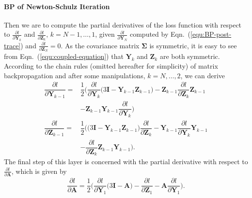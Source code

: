 \documentclass[10pt,twocolumn,letterpaper]{article}
\begin{document}
\paragraph{BP of Newton-Schulz Iteration} Then we are to compute the partial derivatives of the loss function with respect to $\frac{\partial l}{\partial \mathbf{Y}_{k}}$ and $\frac{\partial l}{\partial \mathbf{Z}_{k}}$, $k=N-1, \ldots, 1$, given $\frac{\partial l}{\partial \mathbf{Y}_{N}}$ computed by Eqn.~(\ref{equ:BP-post-trace}) and  $\frac{\partial l}{\partial \mathbf{Z}_{N}}=0$. As the covariance matrix $\boldsymbol{\Sigma}$ is symmetric, it is easy to see from Eqn.~(\ref{equ:coupled-equation}) that $\mathbf{Y}_{k}$ and $\mathbf{Z}_{k}$ are both symmetric. According to the chain rules (omitted hereafter  for simplicity) of matrix backpropagation and after some manipulations, $k=N, \ldots, 2$, we can derive
\begin{align}\label{equ:BP-coupled-equations}
\dfrac{\partial l}{\partial \mathbf{Y}_{k-1}}=&\dfrac{1}{2}\Big(\dfrac{\partial l}{\partial \mathbf{Y}_{k}}\Big(3\mathbf{I}-\mathbf{Y}_{k-1}\mathbf{Z}_{k-1}\Big)-\mathbf{Z}_{k-1}\dfrac{\partial l}{\partial \mathbf{Z}_{k}}\mathbf{Z}_{k-1}\nonumber \\
&-\mathbf{Z}_{k-1}\mathbf{Y}_{k-1}\dfrac{\partial l}{\partial \mathbf{Y}_{k}}\Big)\nonumber\\
\dfrac{\partial l}{\partial \mathbf{Z}_{k-1}}=&\dfrac{1}{2}\Big(\Big(3\mathbf{I}-\mathbf{Y}_{k-1}\mathbf{Z}_{k-1}\Big)\dfrac{\partial l}{\partial \mathbf{Z}_{k}}-\mathbf{Y}_{k-1}\dfrac{\partial l}{\partial \mathbf{Y}_{k}}\mathbf{Y}_{k-1}\nonumber\\
&-\dfrac{\partial l}{\partial \mathbf{Z}_{k}}\mathbf{Z}_{k-1}\mathbf{Y}_{k-1}\Big).
\end{align}
The final step of this layer is concerned with the partial derivative with respect to $\frac{\partial l}{\partial \mathbf{A}}$, which is given by
\begin{align}\label{equ:BP-gradient-A}
\dfrac{\partial l}{\partial \mathbf{A}}=\dfrac{1}{2}\Big(\dfrac{\partial l}{\partial \mathbf{Y}_{1}}\Big(3\mathbf{I}-\mathbf{A}\Big)-\dfrac{\partial l}{\partial \mathbf{Z}_{1}}-\mathbf{A}\dfrac{\partial l}{\partial \mathbf{Y}_{1}}\Big).
\end{align}
\end{document}
